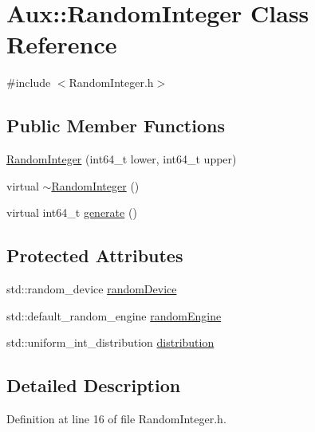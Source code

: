 \hypertarget{class_aux_1_1_random_integer}{\section{Aux\-:\-:Random\-Integer Class Reference}
\label{class_aux_1_1_random_integer}
}


{\ttfamily \#include $<$Random\-Integer.\-h$>$}

\subsection*{Public Member Functions}
\begin{DoxyCompactItemize}
\item 
\hyperlink{class_aux_1_1_random_integer_a8d27f51bf560c2c7ee6251137df0da7d}{Random\-Integer} (int64\-\_\-t lower, int64\-\_\-t upper)
\item 
virtual \hyperlink{class_aux_1_1_random_integer_a7806fd3b03deb0704be523a37677d6dd}{$\sim$\-Random\-Integer} ()
\item 
virtual int64\-\_\-t \hyperlink{class_aux_1_1_random_integer_a288840111a1aa8cdd93949c5fe88ccaa}{generate} ()
\end{DoxyCompactItemize}
\subsection*{Protected Attributes}
\begin{DoxyCompactItemize}
\item 
std\-::random\-\_\-device \hyperlink{class_aux_1_1_random_integer_ad53ce69ad39005e2d155c3d7d3557873}{random\-Device}
\item 
std\-::default\-\_\-random\-\_\-engine \hyperlink{class_aux_1_1_random_integer_a5a4fca08fd29e0b6304d8294441c5711}{random\-Engine}
\item 
std\-::uniform\-\_\-int\-\_\-distribution \hyperlink{class_aux_1_1_random_integer_afcc41e2a6c0897591c848d7461bd9c5a}{distribution}
\end{DoxyCompactItemize}


\subsection{Detailed Description}


Definition at line 16 of file Random\-Integer.\-h.



